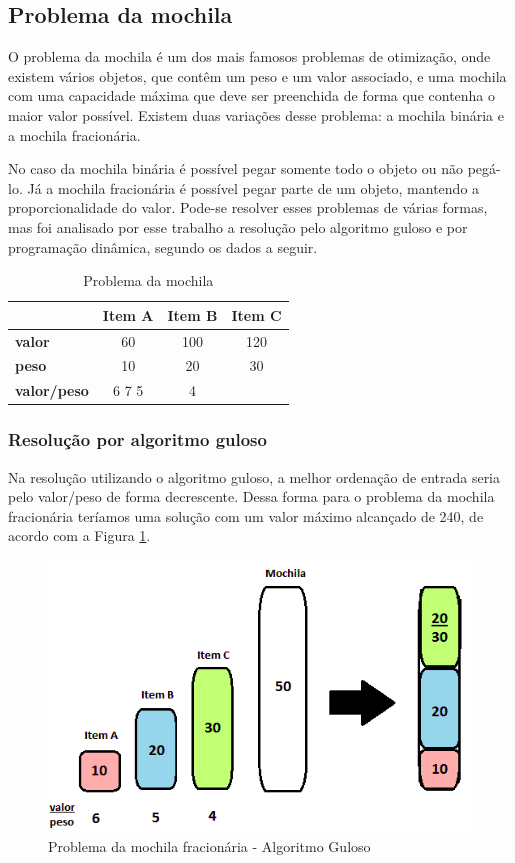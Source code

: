 \subsection{Problema da mochila}
O problema da mochila é um dos mais famosos problemas de otimização, onde existem vários objetos, que contêm um peso e um valor associado, e uma mochila com uma capacidade máxima que deve ser preenchida de forma que contenha o maior valor possível. Existem duas variações desse problema: a mochila binária e a mochila fracionária.

No caso da mochila binária é possível pegar somente todo o objeto ou não pegá-lo. Já a mochila fracionária é possível pegar parte de um objeto, mantendo a proporcionalidade do valor. Pode-se resolver esses problemas de várias formas, mas foi analisado por esse trabalho a resolução pelo algoritmo guloso e por programação dinâmica, segundo os dados a seguir.

\FloatBarrier
\begin{table}[h]
	\centering	
	\begin{tabular}{lccc}
		\toprule
		& \textbf{Item A} & \textbf{Item B} & \textbf{Item C} \\
		\midrule
		\textbf{valor} & 60 & 100 & 120 \\
		\midrule
		\textbf{peso} & 10 & 20 & 30 \\
		\midrule
		\textbf{valor/peso} & 6 7 5 & 4 \\
		\bottomrule
	\end{tabular}
	\caption{Problema da mochila}
	\label{knapsack}
\end{table}


\subsubsection{Resolução por algoritmo guloso}
Na resolução utilizando o algoritmo guloso, a melhor ordenação de entrada seria pelo valor/peso de forma decrescente. Dessa forma para o problema da mochila fracionária teríamos uma solução com um valor máximo alcançado de 240, de acordo com a Figura \ref{mochila}.

\FloatBarrier
\begin{figure}[!h]
\centering
\includegraphics[keepaspectratio=true,scale=0.5]{figuras/mochila.png}
\caption{Problema da mochila fracionária - Algoritmo Guloso}
\label{mochila}
\end{figure}

